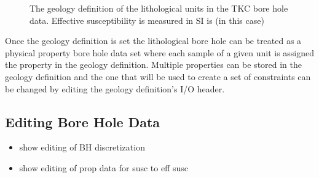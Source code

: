  \begin{figure} [h]
    \centering
    \caption{The geology definition of the lithological units in the TKC bore hole data. Effective susceptibility is measured in SI is (in this case)}
    \label{fig:geoDefBH}
\end{figure}

Once the geology definition is set the lithological bore hole can be treated as a physical property bore hole data set where each sample of a given unit is assigned the property in the geology definition. Multiple properties can be stored in the geology definition and the one that will be used to create a set of constraints can be changed by editing the geology definition's I/O header.

\subsection{Editing Bore Hole Data}
\label{subsec:visBH}

\begin{itemize}
 \item show editing of BH discretization
 \item show editing of prop data for susc to eff susc
\end{itemize}

